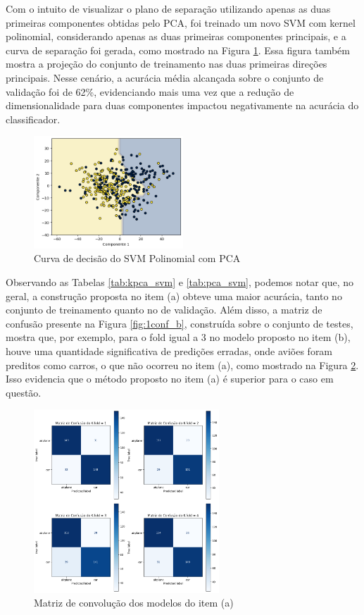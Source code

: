 \documentclass[]{abntex2}
\begin{document}
Com o intuito de visualizar o plano de separação utilizando apenas as duas primeiras componentes obtidas pelo PCA, foi treinado um novo SVM com kernel polinomial, considerando apenas as duas primeiras componentes principais, e a curva de separação foi gerada, como mostrado na Figura \ref{fig:pca_reta}. Essa figura também mostra a projeção do conjunto de treinamento nas duas primeiras direções principais. Nesse cenário, a acurácia média alcançada sobre o conjunto de validação foi de 62\%, evidenciando mais uma vez que a redução de dimensionalidade para duas componentes impactou negativamente na acurácia do classificador.

\begin{figure}[H]
    \centering 
    \includegraphics[width=0.5\textwidth]{imgs/ex1/pca_reta.png}
    \caption{Curva de decisão do SVM Polinomial com PCA}
    \label{fig:pca_reta} %
\end{figure}

Observando as Tabelas \ref{tab:kpca_svm} e \ref{tab:pca_svm}, podemos notar que, no geral, a construção proposta no item (a) obteve uma maior acurácia, tanto no conjunto de treinamento quanto no de validação. Além disso, a matriz de confusão presente na Figura \ref{fig:1conf_b}, construída sobre o conjunto de testes, mostra que, por exemplo, para o fold igual a 3 no modelo proposto no item (b), houve uma quantidade significativa de predições erradas, onde aviões foram preditos como carros, o que não ocorreu no item (a), como mostrado na Figura \ref{fig:1conf_a}. Isso evidencia que o método proposto no item (a) é superior para o caso em questão.

\begin{figure}[H]
    \centering 
    \includegraphics[width=0.62\textwidth]{imgs/ex1/conf_a.png}
    \caption{Matriz de convolução dos modelos do item (a)}
    \label{fig:1conf_a} %
\end{figure}
\end{document}
